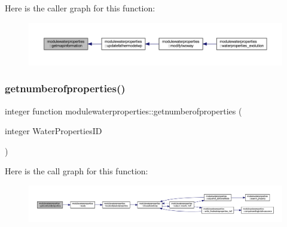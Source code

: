 Here is the caller graph for this function\+:\nopagebreak
\begin{figure}[H]
\begin{center}
\leavevmode
\includegraphics[width=350pt]{namespacemodulewaterproperties_a1b70dbb2ea91a797c991fcc031837095_icgraph}
\end{center}
\end{figure}
\mbox{\label{namespacemodulewaterproperties_a958863880a028313765dd3c1c2b598e2}} 
\subsubsection{\texorpdfstring{getnumberofproperties()}{getnumberofproperties()}}
{\footnotesize\ttfamily integer function modulewaterproperties\+::getnumberofproperties (\begin{DoxyParamCaption}\item[{integer}]{Water\+Properties\+ID }\end{DoxyParamCaption})\hspace{0.3cm}{\ttfamily [private]}}

Here is the call graph for this function\+:\nopagebreak
\begin{figure}[H]
\begin{center}
\leavevmode
\includegraphics[width=350pt]{namespacemodulewaterproperties_a958863880a028313765dd3c1c2b598e2_cgraph}
\end{center}
\end{figure}
\mbox{\label{namespacemodulewaterproperties_af2c46d3b317e3d23dca87bea01a118fa}} 
